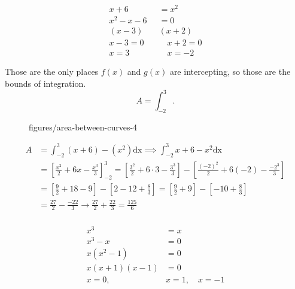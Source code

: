 
\begin{align*}
    x+6&= x^2 \\
    x^2-x-6&= 0 \\
    \left( x-3 \right)&  \left( x+2 \right) \\ 
    x-3 = 0 \quad &\quad  x+2 = 0\\
    x=3 \quad&\quad x=-2
\end{align*}

Those are the only places $f(x)$ and  $g(x)$ are intercepting, so those are the bounds of integration.
\[
A=\int_{-2}^{3}  
.\] 


\begin{figure}[htbp]
    \centering
    \caption{figures/area-between-curves-4}
    \label{fig:area-between-curves-4}
\end{figure}

\begin{align*}
    A&= \int_{-2}^{3} \left( x+6 \right) -(x^2) \text{dx} \implies \int_{-2}^{3} x+6-x^2 \text{dx}   \\
    &= \left[ \frac{x^2}{2}+6x -\frac{x^3}{3}\right]_{-2}^3 = \left[
    \frac{3^2}{2}+6\cdot 3-\frac{3^3}{3} \right] - \left[
\frac{(-2)^2}{2}+6(-2)-\frac{-2^3}{3} \right]  \\
&= \left[  \frac{9}{2}+18-9  \right]-\left[ 2-12+\frac{8}{3} \right]=\left[ \frac{9}{2}+9 \right] -\left[ -10+\frac{8}{3} \right]  \\
&= \frac{27}{2}-\frac{-22}{3}\to \frac{27}{2}+\frac{22}{3}= \frac{125}{6} \\
\end{align*}



\begin{align*}
    x^3&= x \\
    x^3-x&= 0 \\
    x(x^2-1)&= 0 \\
    x(x+1)(x-1)&=0 \\
    x=0 ,\quad & x=1, \quad  x=-1
\end{align*}

